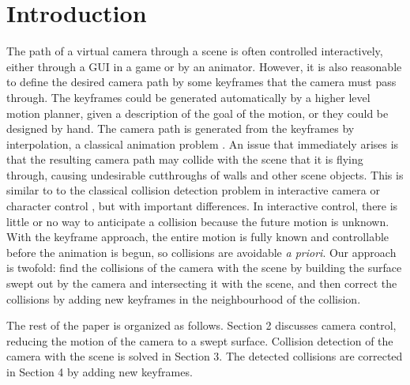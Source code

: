 \documentclass{sig-alternate}
\begin{document}



\section{Introduction}
The path of a virtual camera through a scene is often controlled interactively,
either through a GUI in a game or by an animator.
However, it is also reasonable to define the desired camera path by some
keyframes that the camera must pass through.
The keyframes could be generated automatically by a higher level motion planner,
given a description of the goal of the motion, or they could be designed by hand.
The camera path is generated from the keyframes by interpolation, a classical
animation problem \cite{shoemake85}.
An issue that immediately arises is that the resulting camera path may collide
with the scene that it is flying through, causing undesirable cutthroughs of 
walls and other scene objects.
This is similar to to the classical collision detection problem in interactive
camera or character control \cite{ericson05}, but with important differences.
In interactive control, there is little or no way to anticipate a collision
because the future motion is unknown.
With the keyframe approach, the entire motion is fully known and controllable
before the animation is begun, so collisions are avoidable {\em a priori}.
Our approach is twofold: find the collisions of the camera with the scene by
building the surface swept out by the camera and intersecting it with the
scene, and then correct the collisions by adding new keyframes in the 
neighbourhood of the collision.

The rest of the paper is organized as follows.
Section 2 discusses camera control, reducing the motion of the 
camera to a swept surface.
Collision detection of the camera with the scene is solved in Section 3.
The detected collisions are corrected in Section 4 by adding new keyframes.
\end{document}
